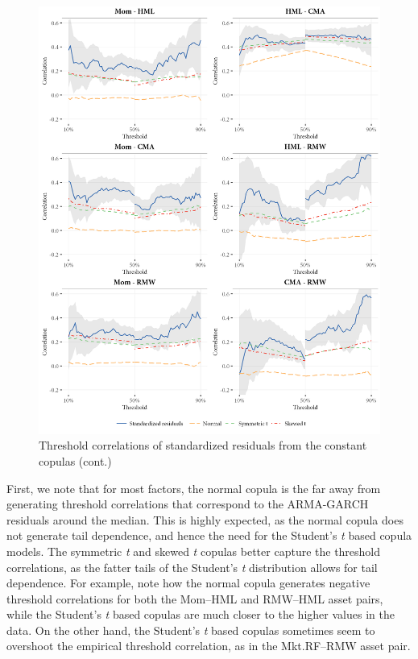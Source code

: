 \begin{figure}[p]
  \ContinuedFloat
  \centering
  \includegraphics[scale=1]{graphics/threshold_simulated_2.png}  
  \footnotesize
  \caption{Threshold correlations of standardized residuals from the constant copulas (cont.)}
\end{figure}

First, we note that for most factors, the normal copula is the far away from generating threshold correlations that correspond to the ARMA-GARCH residuals around the median. This is highly expected, as the normal copula does not generate tail dependence, and hence the need for the Student's \textit{t} based copula models. The symmetric \textit{t} and skewed \textit{t} copulas better capture the threshold correlations, as the fatter tails of the Student's \textit{t} distribution allows for tail dependence. For example, note how the normal copula generates negative threshold correlations for both the Mom--HML and RMW--HML asset pairs, while the Student's \textit{t} based copulas are much closer to the higher values in the data. On the other hand, the Student's \textit{t} based copulas sometimes seem to overshoot the empirical threshold correlation, as in the Mkt.RF--RMW asset pair.

